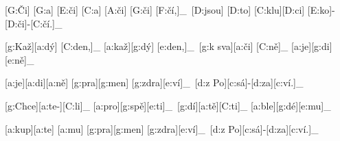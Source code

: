 [G:Či] [G:a] [E:či] [C:a] [A:či] [G:či] [F:čí,]_\
[D:jsou] [D:to] [C:klu][D:ci] [E:ko]-[D:či]-[C:čí.]_\



[g:Kaž][a:dý] [C:den,]_ [a:kaž][g:dý] [e:den,]_\
[g:k sva][a:či] [C:ně]_ [a:je][g:di] [e:ně]_\

[a:je][a:di][a:ně] [g:pra][g:men] [g:zdra][e:ví]_\
[d:z Po][c:sá]-[d:za][c:ví.]_\

[g:Chce][a:te-][C:li]_ [a:pro][g:spě][e:ti]_\
[g:dí][a:tě][C:ti]_ [a:ble][g:dé][e:mu]_\

[a:kup][a:te] [a:mu] [g:pra][g:men] [g:zdra][e:ví]_\
[d:z Po][c:sá]-[d:za][c:ví.]_\

\bye
